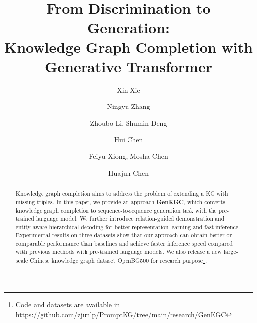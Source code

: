 \documentclass[sigconf]{acmart}
\begin{document}
\title{From Discrimination to Generation:  \protect\\ Knowledge Graph Completion with Generative Transformer}






\author{Xin Xie}

\author{Ningyu Zhang}
\authornotemark[1]

\author{Zhoubo Li, Shumin Deng}


\author{Hui Chen}

\author{Feiyu Xiong, Mosha Chen}


\author{Huajun Chen}

\renewcommand{\shortauthors}{Xin Xie, et al.}

\begin{abstract}

Knowledge graph completion aims to address the problem of extending a KG with missing triples. In this paper, we provide an approach \textbf{GenKGC}, which converts knowledge graph completion to sequence-to-sequence generation task with the pre-trained language model. We further introduce relation-guided demonstration and entity-aware hierarchical decoding for better representation learning and fast inference. Experimental results on three datasets show that our approach can obtain better or comparable performance than baselines and achieve faster inference speed compared with previous methods with pre-trained language models. We also release a new large-scale Chinese knowledge graph dataset OpenBG500 for research purpose\footnote{Code and datasets are available in \url{https://github.com/zjunlp/PromptKG/tree/main/research/GenKGC}}.
\end{abstract}
\end{document}
